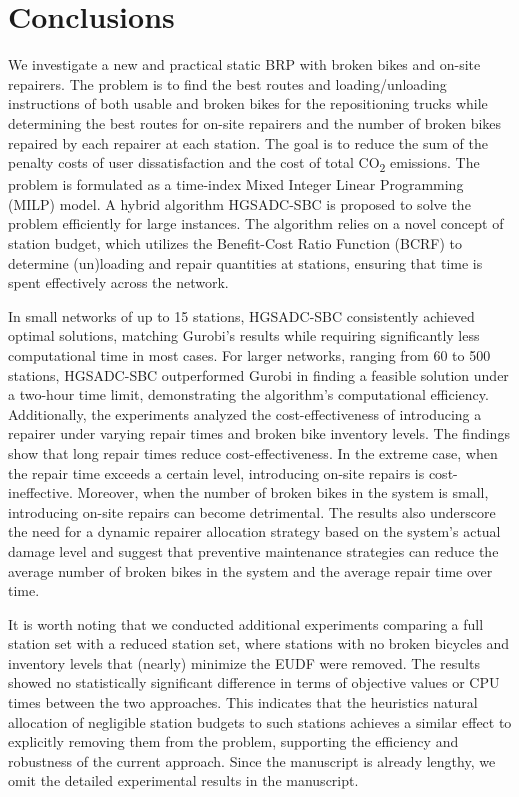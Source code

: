 \section{Conclusions}\label{ch4:sec:conclusions}

We investigate a new and practical static BRP with broken bikes and on-site repairers. The problem
is to find the best routes and loading/unloading instructions of both usable and broken bikes for
the repositioning trucks while determining the best routes for on-site repairers and the number of
broken bikes repaired by each repairer at each station. The goal is to reduce the sum of the penalty
costs of user dissatisfaction and the cost of total CO\textsubscript{2} emissions. The problem is
formulated as a time-index Mixed Integer Linear Programming (MILP) model. A hybrid algorithm
HGSADC-SBC is proposed to solve the problem efficiently for large instances. The algorithm relies on
a novel concept of station budget, which utilizes the Benefit-Cost Ratio Function (BCRF) to
determine (un)loading and repair quantities at stations, ensuring that time is spent effectively
across the network.

In small networks of up to 15 stations, HGSADC-SBC consistently achieved
optimal solutions, matching Gurobi's results while requiring significantly less
computational time in most cases. For larger
networks, ranging from 60 to 500 stations, HGSADC-SBC outperformed Gurobi in
finding a feasible solution under a two-hour time limit, demonstrating the
algorithm's computational efficiency. Additionally, the experiments analyzed the
cost-effectiveness of introducing a repairer under varying repair times and
broken bike inventory levels. The findings show that long repair times reduce
cost-effectiveness. In the extreme case, when the repair time exceeds a certain
level, introducing on-site repairs is cost-ineffective. Moreover, when the number
of broken bikes in the system is small, introducing on-site repairs can become
detrimental. The results also underscore the need for a dynamic repairer
allocation strategy based on the system's actual damage level and suggest that
preventive maintenance strategies can reduce the average number of broken bikes
in the system and the average repair time over time.

It is worth noting that we conducted additional experiments comparing a full station set with a
reduced station set, where stations with no broken bicycles and inventory levels that (nearly)
minimize the EUDF were removed. The results showed no statistically significant difference in terms
of objective values or CPU times between the two approaches. This indicates that the
heuristic\textquotesingle s natural allocation of negligible station budgets to such stations
achieves a similar effect to explicitly removing them from the problem, supporting the efficiency
and robustness of the current approach. Since the manuscript is already lengthy, we omit the
detailed experimental results in the manuscript.

